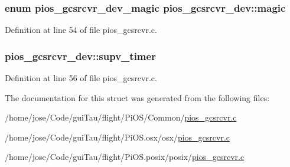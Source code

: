 \hypertarget{structpios__gcsrcvr__dev_a39049abd66fd252962f3a7ce9d14c3f7}{
\subsubsection[{magic}]{\setlength{\rightskip}{0pt plus 5cm}enum {\bf pios\-\_\-gcsrcvr\-\_\-dev\-\_\-magic} pios\-\_\-gcsrcvr\-\_\-dev\-::magic}}\label{structpios__gcsrcvr__dev_a39049abd66fd252962f3a7ce9d14c3f7}


Definition at line 54 of file pios\-\_\-gcsrcvr.\-c.

\hypertarget{structpios__gcsrcvr__dev_a3f792c850523f7eba7efbb0aeebeba37}{
\subsubsection[{supv\-\_\-timer}]{ pios\-\_\-gcsrcvr\-\_\-dev\-::supv\-\_\-timer}}\label{structpios__gcsrcvr__dev_a3f792c850523f7eba7efbb0aeebeba37}


Definition at line 56 of file pios\-\_\-gcsrcvr.\-c.



The documentation for this struct was generated from the following files\-:\begin{DoxyCompactItemize}
\item 
/home/jose/\-Code/gui\-Tau/flight/\-Pi\-O\-S/\-Common/\hyperlink{_common_2pios__gcsrcvr_8c}{pios\-\_\-gcsrcvr.\-c}\item 
/home/jose/\-Code/gui\-Tau/flight/\-Pi\-O\-S.\-osx/osx/\hyperlink{osx_2osx_2pios__gcsrcvr_8c}{pios\-\_\-gcsrcvr.\-c}\item 
/home/jose/\-Code/gui\-Tau/flight/\-Pi\-O\-S.\-posix/posix/\hyperlink{posix_2posix_2pios__gcsrcvr_8c}{pios\-\_\-gcsrcvr.\-c}\end{DoxyCompactItemize}
